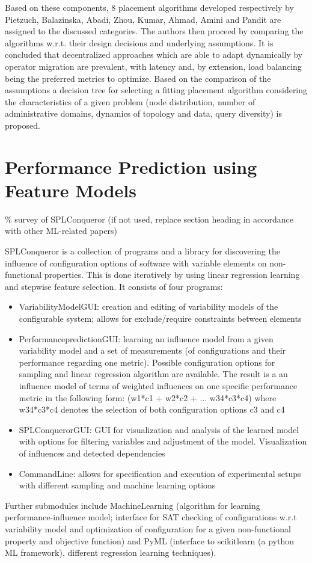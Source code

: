 Based on these components, 8 placement algorithms developed r\gls{esp}ectively by Pietzuch, Balazinska, Abadi, Zhou, Kumar, Ahmad, Amini and Pandit are assigned to the discussed categories. The authors then proceed by comparing the algorithms w.r.t. their design decisions and underlying assumptions. It is concluded that decentralized approaches which are able to adapt dynamically by operator migration are prevalent, with latency and, by extension, load balancing being the preferred metrics to optimize. 
Based on the comparison of the assumptions a decision tree for selecting a fitting placement algorithm considering the characteristics of a given problem (node distribution, number of administrative domains, dynamics of topology and data, query diversity) is proposed.


\section{Performance Prediction using Feature Models}
\% survey of SPLConqueror (if not used, replace section heading in accordance with other ML-related papers)

SPLConqueror is a collection of programs and a library for discovering the influence of configuration options of software with variable elements on non-functional properties. This is done iteratively by using linear regression learning and stepwise feature selection. It consists of four programs: 
\begin{itemize}
\item VariabilityModelGUI: creation and editing of variability models of the configurable system; allows for exclude/require constraints between elements
\item Performan\gls{cep}redictionGUI: learning an influence model from a given variability model and a set of measurements (of configurations and their performance regarding one metric). Possible configuration options for sampling and linear regression algorithm are available. The result is a an influence model of terms of weighted influences on one specific performance metric in the following form: (w1*c1 + w2*c2 + ... w34*c3*c4) where w34*c3*c4 denotes the selection of both configuration options c3 and c4
\item SPLConquerorGUI: GUI for visualization and analysis of the learned model with options for filtering variables and adjustment of the model. Visualization of influences and detected dependencies
\item CommandLine: allows for specification and execution of experimental setups with different sampling and machine learning options
\end{itemize}
 Further submodules include MachineLearning (algorithm for learning performance-influence model; interface for SAT checking of configurations w.r.t variability model and optimization of configuration for a given non-functional property and objective function) and PyML (interface to scikitlearn (a python ML framework), different regression learning techniques).
 
